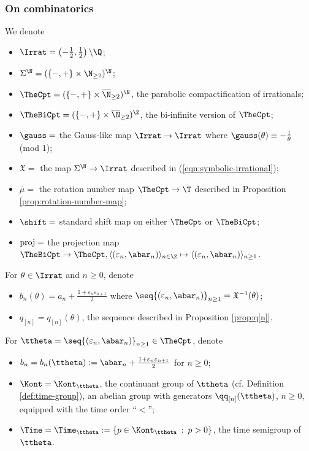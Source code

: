 \documentclass{amsart}
\begin{document}
\subsubsection{On combinatorics}
\label{sss:notation-for-combinatorics}

We denote
\begin{itemize}
    \item $\Irrat = \left( -\frac{1}{2},\frac{1}{2} \right) \backslash \Q$;
    \item $\Sigma^{\N} = ( \{-,+\} \times \N_{\geq 2} )^{\N}$;
    \item $\TheCpt = ( \{-,+\} \times \overline{\N}_{\geq 2} )^{\N}$, the parabolic compactification of irrationals;
    \item $\TheBiCpt = ( \{-,+\} \times \overline{\N}_{\geq 2} )^{\Z}$, the bi-infinite version of $\TheCpt$;
    \item $\gauss =$ the Gauss-like map $\Irrat \to \Irrat$ where $\gauss(\theta) \equiv -\frac{1}{\theta}$ (mod $1$);
    \item $\mathfrak{X} = $ the map $\Sigma^{\N} \to \Irrat$ described in (\ref{eqn:symbolic-irrational});
    \item $\bar{\mu} =$ the rotation number map $\TheCpt \to \T$ described in Proposition \ref{prop:rotation-number-map};
    \item $\shift = $ standard shift map on either $\TheCpt$ or $\TheBiCpt$;
    \item $\textnormal{proj} = $ the projection map $\TheBiCpt \to \TheCpt, \langle (\varepsilon_n, \abar_n) \rangle_{n \in \Z} \mapsto \langle (\varepsilon_n, \abar_n) \rangle_{n \geq 1}$.
\end{itemize}
For $\theta \in \Irrat$ and $n \geq 0$, denote
\begin{itemize}
    \item $ b_n(\theta) = a_n + \frac{1+\varepsilon_n \varepsilon_{n+1}}{2}$ where $\seq{(\varepsilon_n,\abar_n)}_{n\geq 1} = \mathfrak{X}^{-1}(\theta)$;
    \item $q_{[n]} = q_{[n]}(\theta)$, the sequence described in Proposition \ref{prop:q[n]}.
\end{itemize}
For $\ttheta = \seq{(\varepsilon_n,\abar_n)}_{n\geq 1} \in \TheCpt$, denote
\begin{itemize}
    \item $b_n = b_n(\ttheta) := \abar_n + \frac{1+\varepsilon_n \varepsilon_{n+1}}{2}$ for $n \geq 0$;
    \item $\Kont = \Kont_{\ttheta}$, the continuant group of $\ttheta$ (cf. Definition \ref{def:time-group}), an abelian group with generators $\qq_{[n]}(\ttheta)$, $n \geq 0$, equipped with the time order ``$<$'';
    \item $\Time = \Time_{\ttheta} := \{ p \in \Kont_{\ttheta} \: : \: p > 0 \}$, the time semigroup of $\ttheta$.
\end{itemize}
\end{document}
